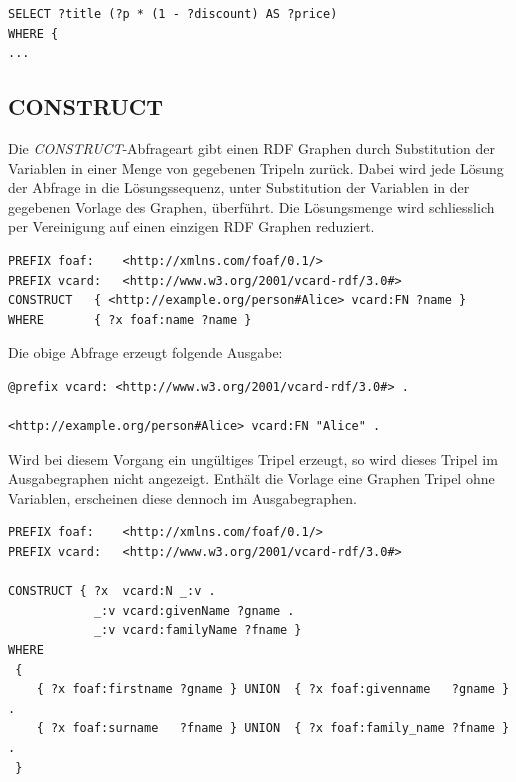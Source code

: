 \begin{lstlisting}
SELECT ?title (?p * (1 - ?discount) AS ?price)
WHERE {
...
\end{lstlisting}


\subsection{CONSTRUCT}
\label{subsec:sparql_abfragearten_construct}
Die \textit{CONSTRUCT}-Abfrageart gibt einen RDF Graphen durch Substitution der Variablen in einer Menge von gegebenen Tripeln zurück. Dabei wird jede Lösung der Abfrage in die Lösungssequenz, unter Substitution der Variablen in der gegebenen Vorlage des Graphen, überführt. Die Lösungsmenge wird schliesslich per Vereinigung auf einen einzigen RDF Graphen reduziert.

\begin{lstlisting}
PREFIX foaf:    <http://xmlns.com/foaf/0.1/>
PREFIX vcard:   <http://www.w3.org/2001/vcard-rdf/3.0#>
CONSTRUCT   { <http://example.org/person#Alice> vcard:FN ?name }
WHERE       { ?x foaf:name ?name }
\end{lstlisting}

Die obige Abfrage erzeugt folgende Ausgabe:
\begin{lstlisting}
@prefix vcard: <http://www.w3.org/2001/vcard-rdf/3.0#> .

<http://example.org/person#Alice> vcard:FN "Alice" .
\end{lstlisting}

Wird bei diesem Vorgang ein ungültiges Tripel erzeugt, so wird dieses Tripel im Ausgabegraphen nicht angezeigt. Enthält die Vorlage eine Graphen Tripel ohne Variablen, erscheinen diese dennoch im Ausgabegraphen.

\begin{lstlisting}
PREFIX foaf:    <http://xmlns.com/foaf/0.1/>
PREFIX vcard:   <http://www.w3.org/2001/vcard-rdf/3.0#>

CONSTRUCT { ?x  vcard:N _:v .
            _:v vcard:givenName ?gname .
            _:v vcard:familyName ?fname }
WHERE
 {
    { ?x foaf:firstname ?gname } UNION  { ?x foaf:givenname   ?gname } .
    { ?x foaf:surname   ?fname } UNION  { ?x foaf:family_name ?fname } .
 }
\end{lstlisting}

